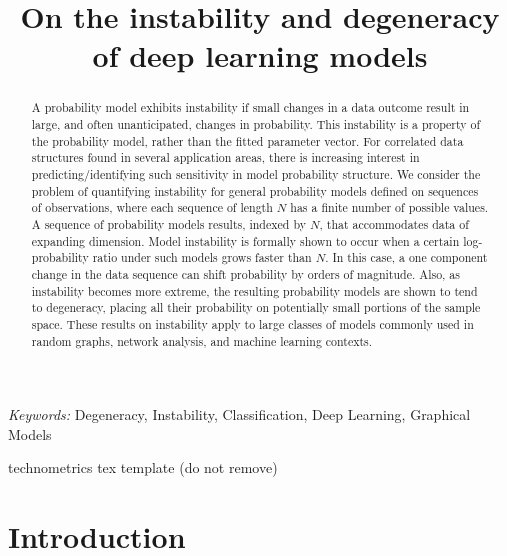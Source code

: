\documentclass[]{article}
\theoremstyle{definition}
\begin{document}
\def\spacingset#1{\renewcommand{\baselinestretch}%
{#1}\small\normalsize} \spacingset{1}

\bigskip
\bigskip
\bigskip
  \title{\bf On the instability and degeneracy of deep learning models}
\medskip

\maketitle
\begin{abstract}
A probability model exhibits instability if small changes in a data
outcome result in large, and often unanticipated, changes in
probability. This instability is a property of the probability model,
rather than the fitted parameter vector. For correlated data structures
found in several application areas, there is increasing interest in
predicting/identifying such sensitivity in model probability structure.
We consider the problem of quantifying instability for general
probability models defined on sequences of observations, where each
sequence of length \(N\) has a finite number of possible values. A
sequence of probability models results, indexed by \(N\), that
accommodates data of expanding dimension. Model instability is formally
shown to occur when a certain log-probability ratio under such models
grows faster than \(N\). In this case, a one component change in the
data sequence can shift probability by orders of magnitude. Also, as
instability becomes more extreme, the resulting probability models are
shown to tend to degeneracy, placing all their probability on
potentially small portions of the sample space. These results on
instability apply to large classes of models commonly used in random
graphs, network analysis, and machine learning contexts.
\end{abstract}
\noindent%
{\it Keywords:}  Degeneracy, Instability, Classification, Deep Learning, Graphical Models
\vfill

\hfill {\tiny technometrics tex template (do not remove)}
\newpage
\spacingset{1.45} %


\section{Introduction}\label{introduction}
\end{document}
